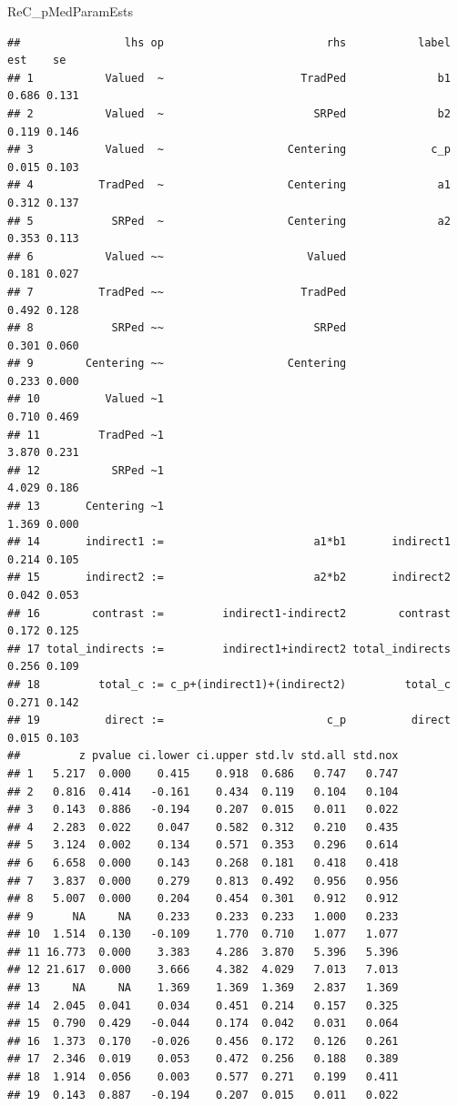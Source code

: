 \documentclass[
  11pt,
]{book}
\newenvironment{Shaded}{\begin{snugshade}}{\end{snugshade}}
\newcommand{\NormalTok}[1]{#1}
\begin{document}
\begin{Shaded}
\begin{Highlighting}[]
\NormalTok{ReC\_pMedParamEsts}
\end{Highlighting}
\end{Shaded}

\begin{verbatim}
##                lhs op                         rhs           label   est    se
## 1           Valued  ~                     TradPed              b1 0.686 0.131
## 2           Valued  ~                       SRPed              b2 0.119 0.146
## 3           Valued  ~                   Centering             c_p 0.015 0.103
## 4          TradPed  ~                   Centering              a1 0.312 0.137
## 5            SRPed  ~                   Centering              a2 0.353 0.113
## 6           Valued ~~                      Valued                 0.181 0.027
## 7          TradPed ~~                     TradPed                 0.492 0.128
## 8            SRPed ~~                       SRPed                 0.301 0.060
## 9        Centering ~~                   Centering                 0.233 0.000
## 10          Valued ~1                                             0.710 0.469
## 11         TradPed ~1                                             3.870 0.231
## 12           SRPed ~1                                             4.029 0.186
## 13       Centering ~1                                             1.369 0.000
## 14       indirect1 :=                       a1*b1       indirect1 0.214 0.105
## 15       indirect2 :=                       a2*b2       indirect2 0.042 0.053
## 16        contrast :=         indirect1-indirect2        contrast 0.172 0.125
## 17 total_indirects :=         indirect1+indirect2 total_indirects 0.256 0.109
## 18         total_c := c_p+(indirect1)+(indirect2)         total_c 0.271 0.142
## 19          direct :=                         c_p          direct 0.015 0.103
##         z pvalue ci.lower ci.upper std.lv std.all std.nox
## 1   5.217  0.000    0.415    0.918  0.686   0.747   0.747
## 2   0.816  0.414   -0.161    0.434  0.119   0.104   0.104
## 3   0.143  0.886   -0.194    0.207  0.015   0.011   0.022
## 4   2.283  0.022    0.047    0.582  0.312   0.210   0.435
## 5   3.124  0.002    0.134    0.571  0.353   0.296   0.614
## 6   6.658  0.000    0.143    0.268  0.181   0.418   0.418
## 7   3.837  0.000    0.279    0.813  0.492   0.956   0.956
## 8   5.007  0.000    0.204    0.454  0.301   0.912   0.912
## 9      NA     NA    0.233    0.233  0.233   1.000   0.233
## 10  1.514  0.130   -0.109    1.770  0.710   1.077   1.077
## 11 16.773  0.000    3.383    4.286  3.870   5.396   5.396
## 12 21.617  0.000    3.666    4.382  4.029   7.013   7.013
## 13     NA     NA    1.369    1.369  1.369   2.837   1.369
## 14  2.045  0.041    0.034    0.451  0.214   0.157   0.325
## 15  0.790  0.429   -0.044    0.174  0.042   0.031   0.064
## 16  1.373  0.170   -0.026    0.456  0.172   0.126   0.261
## 17  2.346  0.019    0.053    0.472  0.256   0.188   0.389
## 18  1.914  0.056    0.003    0.577  0.271   0.199   0.411
## 19  0.143  0.887   -0.194    0.207  0.015   0.011   0.022
\end{verbatim}
\end{document}
